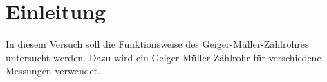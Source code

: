 
\section{Einleitung}
In diesem Versuch soll die Funktionsweise des 
Geiger-Müller-Zählrohres untersucht werden. Dazu
wird ein Geiger-Müller-Zählrohr für verschiedene Messungen
verwendet.